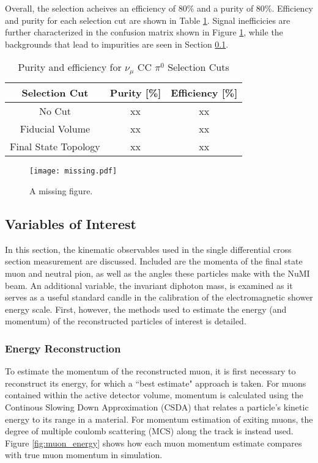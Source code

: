\documentclass[../main.tex]{subfiles}
\begin{document}
Overall, the selection acheives an efficiency of 80\% and a purity of 80\%.  Efficiency and purity for each selection cut are shown in Table \ref{Tab:pureff}.  Signal inefficicies are further characterized in the confusion matrix shown in Figure \ref{fig:efficiency_confusion}, while the backgrounds that lead to impurities are seen in Section \ref{subsec:vars}.

\begin{table}[ht]
    \caption{Purity and efficiency for $\nu_{\mu}$ CC $\pi^{0}$ Selection Cuts}
    \vspace{0.1cm}
    \centering
    \begin{tabular}{ c c c } 
    \hline
    Selection Cut & Purity [\%] & Efficiency [\%]  \\
    \hline
    No Cut & xx & xx \\ 
    Fiducial Volume & xx & xx \\
    Final State Topology & xx & xx \\ 
    \hline
    \end{tabular}
    \label{Tab:pureff}
\end{table}

\begin{figure}[H]
    \center
    \texttt{[image: missing.pdf]}
    \caption[text]{A missing figure.}
    \label{fig:efficiency_confusion}
\end{figure}

\subsection{Variables of Interest}
\label{subsec:vars}
In this section, the kinematic observables used in the single differential cross section measurement are discussed.  Included are the momenta of the final state muon and neutral pion, as well as the angles these particles make with the NuMI beam.  An additional variable, the invariant diphoton mass, is examined as it serves as a useful standard candle in the calibration of the electromagnetic shower energy scale.  First, however, the methods used to estimate the energy (and momentum) of the reconstructed particles of interest is detailed.

\subsubsection{Energy Reconstruction}
To estimate the momentum of the reconstructed muon, it is first necessary to reconstruct its energy, for which a ``best estimate" approach is taken.  For muons contained within the active detector volume, momentum is calculated using the Continous Slowing Down Approximation (CSDA) that relates a particle's kinetic energy to its range in a material.  For momentum estimation of exiting muons, the degree of multiple coulomb scattering (MCS) along the track is instead used.  Figure \ref{fig:muon_energy} shows how each muon momentum estimate compares with true muon momentum in simulation.
\end{document}
